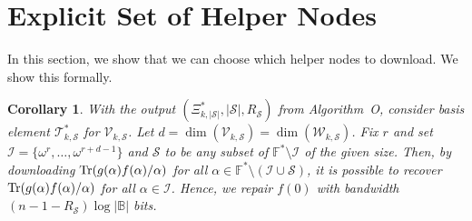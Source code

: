 \documentclass[onecolumn]{IEEEtran}
\theoremstyle{plain}
\newtheorem{corollary}[theorem]{Corollary}
\theoremstyle{definition}
\newcommand{\FF}{\mathbb{F}}
\newcommand{\BB}{\mathbb{B}}
\newcommand{\cS}{\mathcal{S}}
\newcommand{\cT}{\mathcal{T}}
\newcommand{\cW}{\mathcal{W}}
\newcommand{\cV}{\mathcal{V}}
\newcommand{\cI}{\mathcal{I}}
\newcommand{\tr}{{\rm Tr}}
\newcommand{\kim}[1]{{\color{blue} Kim:#1}}
\begin{document}
\section{Explicit Set of Helper Nodes}

\noindent In this section, we show that we can choose which helper nodes to download. We show this formally.  


\begin{corollary}\label{cor:nodes_to_download}
    With the output $(\Xi_{k,|\cS|}^*,|\cS|,R_{\cS})$ from Algorithm~O, consider basis element $\cT_{k,\cS}^*$ for $\cV_{k,\cS}$. Let $d = \dim(\cV_{k,\cS}) = \dim(\cW_{k,\cS})$. Fix $r$ and set $\cI = \{\omega^r,\ldots,\omega^{r+d-1}\}$ and $\cS$ to be any subset of $\FF^*\setminus\cI$ of the given size. Then, by downloading $\tr(g(\alpha)f(\alpha)/\alpha)$ for all $\alpha\in\FF^*\setminus(\cI\cup\cS)$, it is possible to recover $\tr(g(\alpha)f(\alpha)/\alpha)$ for all $\alpha\in\cI$. 
    Hence, we repair $f(0)$ with bandwidth $(n-1-R_\cS)\log|\BB|$ bits.
\end{corollary}
\end{document}
